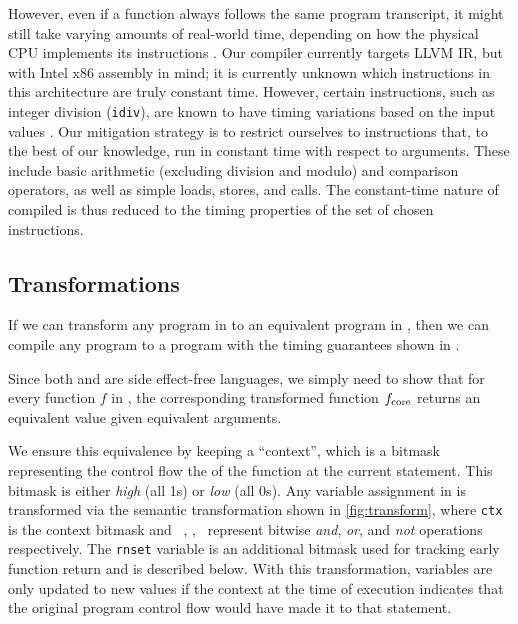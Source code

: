However, even if a function always follows the same program transcript,
it might still take varying amounts of real-world time, depending
on how the physical CPU implements its instructions . Our compiler
currently targets LLVM IR, but with Intel x86 assembly in mind; it is currently unknown  which instructions in this architecture are truly constant time. However, certain
instructions, such as integer division (\texttt{idiv}), are known to have timing variations
based on the input values . Our
mitigation strategy is to restrict ourselves to instructions that, to the best of our knowledge,
run in constant time with respect to arguments.
These include basic arithmetic (excluding division and modulo) and comparison operators, as well as
simple loads, stores, and calls. The constant-time nature of compiled
\ccore is thus reduced to the timing properties of the set of chosen instructions.

\subsection{Transformations}

If we can transform any program in \constc to an equivalent program in \ccore, then
we can compile any \constc program to a program with the timing guarantees shown in \ccore.

Since both \ccore
and \constc are side effect-free languages, we simply need to show that for
every function $f$ in \constc, the corresponding transformed function
$f_{\textnormal{core}}$ returns an equivalent value given equivalent arguments.

We ensure this equivalence by keeping a ``context'', which is a bitmask
representing the control flow the of the function at the current statement.
This bitmask is either \emph{high} (all 1s) or \emph{low} (all 0s).
Any variable assignment
in \constc is transformed
via the semantic transformation  shown in \autoref{fig:transform},
where \texttt{ctx} is the context bitmask and ~\band, \bor, \bnot\ represent
bitwise \emph{and}, \emph{or}, and \emph{not} operations respectively.
The \texttt{rnset}
variable is an additional bitmask used for tracking early function return and
is described below.  With this transformation, variables are only updated to
new values if the context at the time of execution indicates that the original
program control flow would have made it to that statement.

